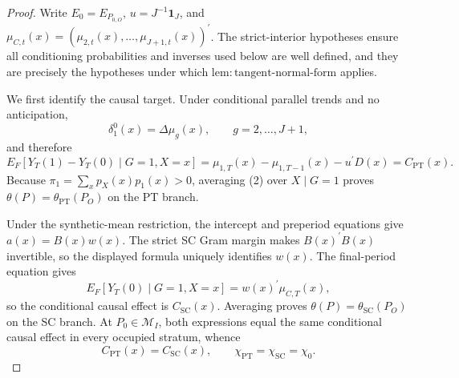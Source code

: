 \documentclass{article}
\begin{document}
\begin{proof}
Write \(E_0=E_{P_{0,O}}\), \(u=J^{-1}\mathbf 1_J\), and \(\mu_{C,t}(x)=(\mu_{2,t}(x),\ldots,\mu_{J+1,t}(x))^{\prime}\).  The strict-interior hypotheses ensure all conditioning probabilities and inverses used below are well defined, and they are precisely the hypotheses under which \(\mathrm{lem{:}tangent\text{-}normal\text{-}form}\) applies.

We first identify the causal target.  Under conditional parallel trends and no anticipation,
\[
 \delta_1^0(x)=\Delta\mu_g(x),
 \qquad g=2,\ldots,J+1,
 \tag{1}
\]
and therefore
\[
 E_F[Y_T(1)-Y_T(0)\mid G=1,X=x]
 =\mu_{1,T}(x)-\mu_{1,T-1}(x)-u^{\prime}D(x)
 =C_{\mathrm{PT}}(x).
 \tag{2}
\]
Because \(\pi_1=\sum_xp_X(x)p_1(x)>0\), averaging (2) over \(X\mid G=1\) proves \(\theta(P)=\theta_{\mathrm{PT}}(P_O)\) on the PT branch.

Under the synthetic-mean restriction, the intercept and preperiod equations give \(a(x)=B(x)w(x)\).  The strict SC Gram margin makes \(B(x)^{\prime}B(x)\) invertible, so the displayed formula uniquely identifies \(w(x)\).  The final-period equation gives
\[
 E_F[Y_T(0)\mid G=1,X=x]=w(x)^{\prime}\mu_{C,T}(x),
 \tag{3}
\]
so the conditional causal effect is \(C_{\mathrm{SC}}(x)\).  Averaging proves \(\theta(P)=\theta_{\mathrm{SC}}(P_O)\) on the SC branch.  At \(P_0\in\mathcal M_I\), both expressions equal the same conditional causal effect in every occupied stratum, whence
\[
 C_{\mathrm{PT}}(x)=C_{\mathrm{SC}}(x),
 \qquad
 \chi_{\mathrm{PT}}=\chi_{\mathrm{SC}}=\chi_0.
 \tag{4}
\]


\end{proof}
\end{document}
